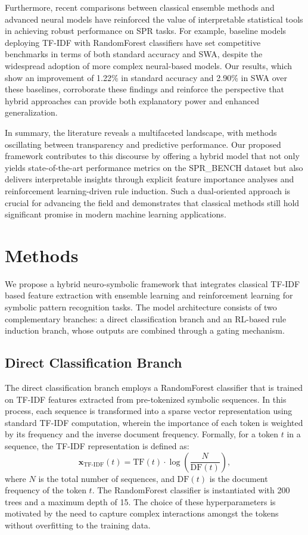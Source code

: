 \documentclass{article}
\begin{document}
Furthermore, recent comparisons between classical ensemble methods and advanced neural models have reinforced the value of interpretable statistical tools in achieving robust performance on SPR tasks. For example, baseline models deploying TF-IDF with RandomForest classifiers have set competitive benchmarks in terms of both standard accuracy and SWA, despite the widespread adoption of more complex neural-based models. Our results, which show an improvement of 1.22\% in standard accuracy and 2.90\% in SWA over these baselines, corroborate these findings and reinforce the perspective that hybrid approaches can provide both explanatory power and enhanced generalization.

In summary, the literature reveals a multifaceted landscape, with methods oscillating between transparency and predictive performance. Our proposed framework contributes to this discourse by offering a hybrid model that not only yields state-of-the-art performance metrics on the SPR\_BENCH dataset but also delivers interpretable insights through explicit feature importance analyses and reinforcement learning-driven rule induction. Such a dual-oriented approach is crucial for advancing the field and demonstrates that classical methods still hold significant promise in modern machine learning applications.

\section{Methods}
We propose a hybrid neuro-symbolic framework that integrates classical TF-IDF based feature extraction with ensemble learning and reinforcement learning for symbolic pattern recognition tasks. The model architecture consists of two complementary branches: a direct classification branch and an RL-based rule induction branch, whose outputs are combined through a gating mechanism.

\subsection{Direct Classification Branch}
The direct classification branch employs a RandomForest classifier that is trained on TF-IDF features extracted from pre-tokenized symbolic sequences. In this process, each sequence is transformed into a sparse vector representation using standard TF-IDF computation, wherein the importance of each token is weighted by its frequency and the inverse document frequency. Formally, for a token \( t \) in a sequence, the TF-IDF representation is defined as:
\[
\mathbf{x}_{\text{TF-IDF}}(t) = \text{TF}(t) \cdot \log\left(\frac{N}{\text{DF}(t)}\right),
\]
where \( N \) is the total number of sequences, and \(\text{DF}(t)\) is the document frequency of the token \( t \). The RandomForest classifier is instantiated with 200 trees and a maximum depth of 15. The choice of these hyperparameters is motivated by the need to capture complex interactions amongst the tokens without overfitting to the training data.
\end{document}
